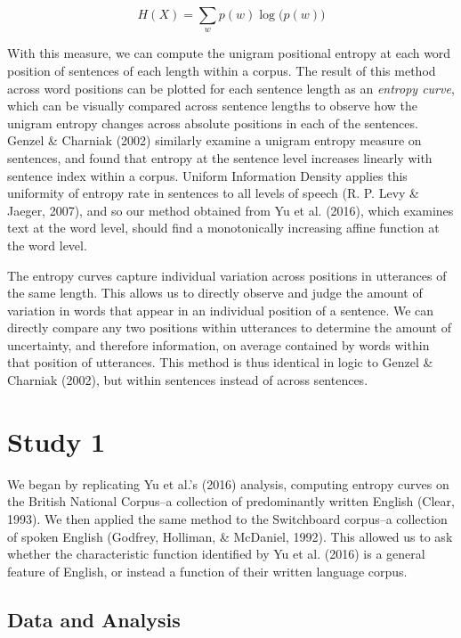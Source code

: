 \documentclass[10pt, letterpaper]{article}
\begin{document}
\[H(X) = \sum\limits_w p(w)\log\big(p(w)\big)\]

With this measure, we can compute the unigram positional entropy at each
word position of sentences of each length within a corpus. The result of
this method across word positions can be plotted for each sentence
length as an \emph{entropy curve}, which can be visually compared across
sentence lengths to observe how the unigram entropy changes across
absolute positions in each of the sentences. Genzel \& Charniak (2002)
similarly examine a unigram entropy measure on sentences, and found that
entropy at the sentence level increases linearly with sentence index
within a corpus. Uniform Information Density applies this uniformity of
entropy rate in sentences to all levels of speech (R. P. Levy \& Jaeger,
2007), and so our method obtained from Yu et al. (2016), which examines
text at the word level, should find a monotonically increasing affine
function at the word level.

The entropy curves capture individual variation across positions in
utterances of the same length. This allows us to directly observe and
judge the amount of variation in words that appear in an individual
position of a sentence. We can directly compare any two positions within
utterances to determine the amount of uncertainty, and therefore
information, on average contained by words within that position of
utterances. This method is thus identical in logic to Genzel \& Charniak
(2002), but within sentences instead of across sentences.

\section{Study 1}\label{study-1}

We began by replicating Yu et al.'s (2016) analysis, computing entropy
curves on the British National Corpus--a collection of predominantly
written English (Clear, 1993). We then applied the same method to the
Switchboard corpus--a collection of spoken English (Godfrey, Holliman,
\& McDaniel, 1992). This allowed us to ask whether the characteristic
function identified by Yu et al. (2016) is a general feature of English,
or instead a function of their written language corpus.

\subsection{Data and Analysis}\label{data-and-analysis}
\end{document}
